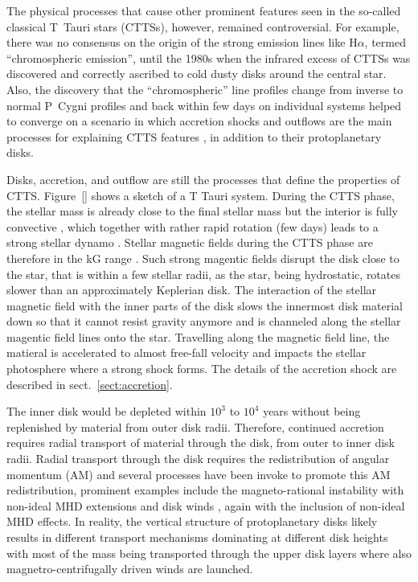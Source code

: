 The physical processes that cause other prominent features seen in the so-called classical T~Tauri stars (CTTSs), however, remained controversial.
For example, there was no consensus on the origin of the
strong emission lines like H$\alpha$, termed “chromospheric emission”, until the 1980s when the infrared excess of CTTSs was discovered and correctly ascribed to cold dusty disks around the central star. Also, the discovery that the ``chromospheric'' line profiles change from inverse to normal P~Cygni profiles and back within few days on individual systems helped to converge on a scenario in which accretion shocks and outflows are the main processes for explaining CTTS features \citep[as nicely described in][]{Bertout_2007}, in addition to their protoplanetary disks.

Disks, accretion, and outflow are still the processes that define the properties of CTTS. Figure~\ref{} shows a sketch of a T Tauri system.
During the CTTS phase, the stellar mass is already close to the final stellar mass but the interior is fully convective \citep{}, which together with rather rapid rotation (few days) leads to a strong stellar dynamo \citep{}. Stellar magnetic fields during the CTTS phase are therefore in the kG range \citep{}. Such strong magentic fields disrupt the disk close to the star, that is within a few stellar radii, as the star, being hydrostatic, rotates slower than an approximately Keplerian disk. The interaction of the stellar magnetic field with the inner parts of the disk slows the innermost disk material down so that it cannot resist gravity anymore and is channeled along the stellar magentic field lines onto the star. Travelling along the magnetic field line, the matieral is accelerated to almost free-fall velocity and impacts the stellar photosphere where a strong shock forms. The details of the accretion shock are described in sect.~\ref{sect:accretion}.%

The inner disk would be depleted within $10^3$ to $10^4$ years without being replenished by material from outer disk radii. Therefore, continued accretion requires radial transport of material through the disk, from outer to inner disk radii. Radial transport through the disk requires the redistribution of angular momentum (AM) and several processes have been invoke to promote this AM redistribution, prominent examples include the magneto-rational instability \citep[MRI,][]{Balbus_1991} with non-ideal MHD extensions and disk winds \citep{Blandford_1982, Pudritz_1983}, again with the inclusion of non-ideal MHD effects. In reality, the vertical structure of protoplanetary disks likely results in different transport mechanisms dominating at different disk heights with most of the mass being transported through the upper disk layers where also magnetro-centrifugally driven winds are launched.


